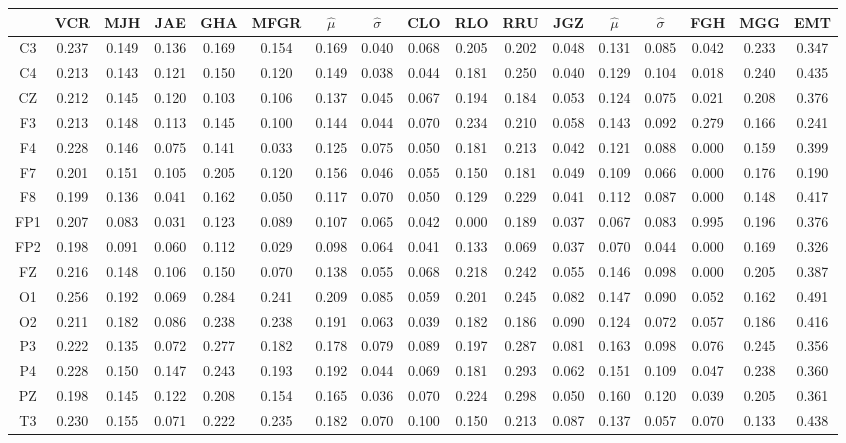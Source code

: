 \begin{SidewaysFigure}
\centering
\begin{tabular}{c||ccccc|cc||cccc|cc||ccc}
& VCR & MJH & JAE & GHA & MFGR &$\widehat{\mu}$ & $\widehat{\sigma}$
& CLO & RLO & RRU & JGZ &$\widehat{\mu}$ & $\widehat{\sigma}$
& FGH & MGG & EMT \\
\hline
C3&0.237&0.149&0.136&0.169&0.154&0.169&0.040&0.068&0.205&0.202&0.048&0.131&0.085&0.042&0.233&0.347 \\
C4&0.213&0.143&0.121&0.150&0.120&0.149&0.038&0.044&0.181&0.250&0.040&0.129&0.104&0.018&0.240&0.435 \\
CZ&0.212&0.145&0.120&0.103&0.106&0.137&0.045&0.067&0.194&0.184&0.053&0.124&0.075&0.021&0.208&0.376 \\
F3&0.213&0.148&0.113&0.145&0.100&0.144&0.044&0.070&0.234&0.210&0.058&0.143&0.092&0.279&0.166&0.241 \\
F4&0.228&0.146&0.075&0.141&0.033&0.125&0.075&0.050&0.181&0.213&0.042&0.121&0.088&0.000&0.159&0.399 \\
F7&0.201&0.151&0.105&0.205&0.120&0.156&0.046&0.055&0.150&0.181&0.049&0.109&0.066&0.000&0.176&0.190 \\
F8&0.199&0.136&0.041&0.162&0.050&0.117&0.070&0.050&0.129&0.229&0.041&0.112&0.087&0.000&0.148&0.417 \\
FP1&0.207&0.083&0.031&0.123&0.089&0.107&0.065&0.042&0.000&0.189&0.037&0.067&0.083&0.995&0.196&0.376 \\
FP2&0.198&0.091&0.060&0.112&0.029&0.098&0.064&0.041&0.133&0.069&0.037&0.070&0.044&0.000&0.169&0.326 \\
FZ&0.216&0.148&0.106&0.150&0.070&0.138&0.055&0.068&0.218&0.242&0.055&0.146&0.098&0.000&0.205&0.387 \\
O1&0.256&0.192&0.069&0.284&0.241&0.209&0.085&0.059&0.201&0.245&0.082&0.147&0.090&0.052&0.162&0.491 \\
O2&0.211&0.182&0.086&0.238&0.238&0.191&0.063&0.039&0.182&0.186&0.090&0.124&0.072&0.057&0.186&0.416 \\
P3&0.222&0.135&0.072&0.277&0.182&0.178&0.079&0.089&0.197&0.287&0.081&0.163&0.098&0.076&0.245&0.356 \\
P4&0.228&0.150&0.147&0.243&0.193&0.192&0.044&0.069&0.181&0.293&0.062&0.151&0.109&0.047&0.238&0.360 \\
PZ&0.198&0.145&0.122&0.208&0.154&0.165&0.036&0.070&0.224&0.298&0.050&0.160&0.120&0.039&0.205&0.361 \\
T3&0.230&0.155&0.071&0.222&0.235&0.182&0.070&0.100&0.150&0.213&0.087&0.137&0.057&0.070&0.133&0.438 \\

\end{tabular}
\end{SidewaysFigure}
